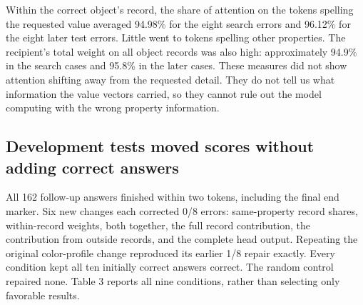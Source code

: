 \documentclass[10pt,letterpaper]{article}
\begin{document}
Within the correct object's record, the share of attention on the tokens spelling the requested value averaged 94.98\% for the eight search errors and 96.12\% for the eight later test errors. Little went to tokens spelling other properties. The recipient's total weight on all object records was also high: approximately 94.9\% in the search cases and 95.8\% in the later cases. These measures did not show attention shifting away from the requested detail. They do not tell us what information the value vectors carried, so they cannot rule out the model computing with the wrong property information.


\subsection*{Development tests moved scores without adding correct answers}

All 162 follow-up answers finished within two tokens, including the final end marker. Six new changes each corrected 0/8 errors: same-property record shares, within-record weights, both together, the full record contribution, the contribution from outside records, and the complete head output. Repeating the original color-profile change reproduced its earlier 1/8 repair exactly. Every condition kept all ten initially correct answers correct. The random control repaired none. Table 3 reports all nine conditions, rather than selecting only favorable results.
\end{document}
